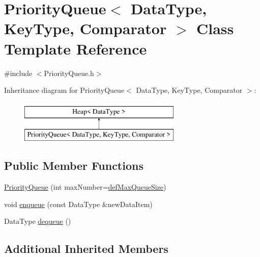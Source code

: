 \hypertarget{class_priority_queue}{\section{Priority\+Queue$<$ Data\+Type, Key\+Type, Comparator $>$ Class Template Reference}
\label{class_priority_queue}
}


{\ttfamily \#include $<$Priority\+Queue.\+h$>$}

Inheritance diagram for Priority\+Queue$<$ Data\+Type, Key\+Type, Comparator $>$\+:\begin{figure}[H]
\begin{center}
\leavevmode
\includegraphics[height=2.000000cm]{class_priority_queue}
\end{center}
\end{figure}
\subsection*{Public Member Functions}
\begin{DoxyCompactItemize}
\item 
\hyperlink{class_priority_queue_a47de2a46cff1d6a6ed30a99c94dc1b14}{Priority\+Queue} (int max\+Number=\hyperlink{_priority_queue_8h_a88703212007be018800be64f2f5fde2f}{def\+Max\+Queue\+Size})
\item 
void \hyperlink{class_priority_queue_a61f3339cf0e87c67ed004f8eff0a1bfa}{enqueue} (const Data\+Type \&new\+Data\+Item)
\item 
Data\+Type \hyperlink{class_priority_queue_a5bc758e313d6244e672ea6e81d695a46}{dequeue} ()
\end{DoxyCompactItemize}
\subsection*{Additional Inherited Members}


